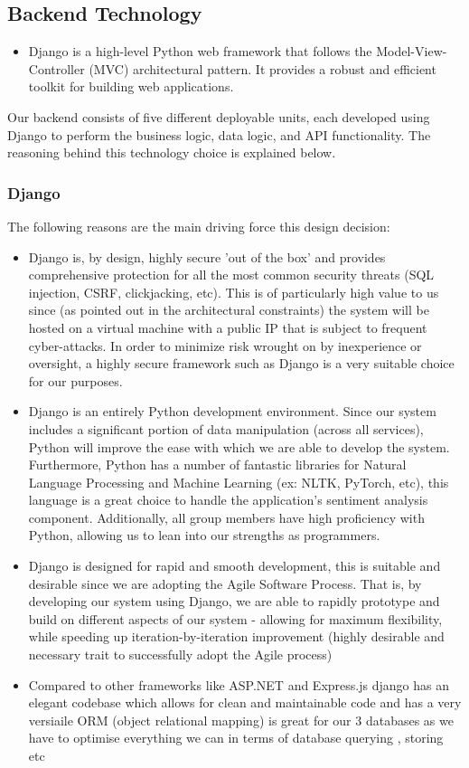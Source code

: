 \documentclass[12pt]{article}
\begin{document}
\subsection{Backend Technology}
\begin{itemize}
    \item Django is a high-level Python web framework that follows the Model-View-Controller (MVC) architectural pattern. It provides a robust and efficient toolkit for building web applications.
\end{itemize}
Our backend consists of five different deployable units, each developed using Django to perform the business logic, data logic, and API functionality. The reasoning behind this technology choice is explained below.
\subsubsection{Django}
The following reasons are the main driving force this design decision:
\begin{itemize}
    \item Django is, by design, highly secure 'out of the box' and provides comprehensive protection for all the most common security threats (SQL injection, CSRF, clickjacking, etc). This is of particularly high value to us since (as pointed out in the architectural constraints) the system will be hosted on a virtual machine with a public IP that is subject to frequent cyber-attacks. In order to minimize risk wrought on by inexperience or oversight, a highly secure framework such as Django is a very suitable choice for our purposes.
    \item Django is an entirely Python development environment. Since our system includes a significant portion of data manipulation (across all services), Python will improve the ease with which we are able to develop the system. Furthermore, Python has a number of fantastic libraries for Natural Language Processing and Machine Learning (ex: NLTK, PyTorch, etc), this language is a great choice to handle the application's sentiment analysis component. Additionally, all group members have high proficiency with Python, allowing us to lean into our strengths as programmers.
    \item Django is designed for rapid and smooth development, this is suitable and desirable since we are adopting the Agile Software Process. That is, by developing our system using Django, we are able to rapidly prototype and build on different aspects of our system - allowing for maximum flexibility, while speeding up iteration-by-iteration improvement (highly desirable and necessary trait to successfully adopt the Agile process)
    \item Compared to other frameworks like ASP.NET and Express.js django has an elegant codebase which allows for clean and maintainable code and has a very versiaile ORM (object relational mapping) is great for our 3 databases as we have to optimise everything we can in terms of database querying , storing etc
\end{itemize}
\end{document}
